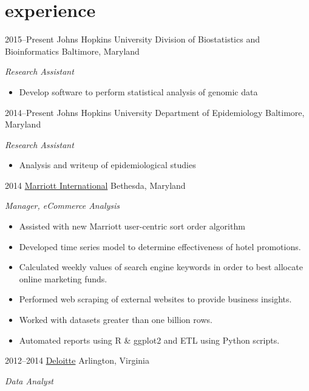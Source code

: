 \documentclass[]{friggeri-cv} %
\begin{document}

\section{experience}

\begin{entrylist}
\entry
{2015--Present}
{Johns Hopkins University Division of Biostatistics and Bioinformatics}
{Baltimore, Maryland}
{\emph{Research Assistant}
\begin{itemize}
\renewcommand\labelitemi{--}
\item Develop software to perform statistical analysis of genomic data
\end{itemize}
}
\entry
{2014--Present}
{Johns Hopkins University Department of Epidemiology}
{Baltimore, Maryland}
{\emph{Research Assistant}
\begin{itemize}
\renewcommand\labelitemi{--}
\item Analysis and writeup of epidemiological studies
\end{itemize}
}
\entry
{2014}
{\href{http://www.marriott.com/}{Marriott International}}
{Bethesda, Maryland}
{\emph{Manager, eCommerce Analysis}
\begin{itemize}
\renewcommand\labelitemi{--}
\item Assisted with new Marriott user-centric sort order algorithm
\item Developed time series model to determine effectiveness of hotel promotions. 
\item Calculated weekly values of search engine keywords in order to best allocate online marketing funds.
\item Performed web scraping of external websites to provide business insights.
\item Worked with datasets greater than one billion rows.
\item Automated reports using R \& ggplot2 and ETL using Python scripts.
\end{itemize}
}
\entry
{2012--2014}
{\href{http://www.deloitte.com/}{Deloitte}}
{Arlington, Virginia}
{\emph{Data Analyst}
\begin{itemize}

\end{itemize}}
\end{entrylist}
\end{document}
